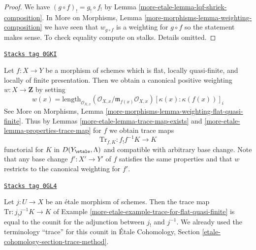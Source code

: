 \begin{proof}
We have $(g \circ f)_! = g_! \circ f_!$ by
Lemma \ref{more-etale-lemma-lqf-shriek-composition}.
In More on Morphisms, Lemma \ref{more-morphisms-lemma-weighting-composition}
we have seen that $w_{g \circ f}$ is a weighting for $g \circ f$
so the statement makes sense. To check equality compute on stalks.
Details omitted.
\end{proof}

\begin{example}

\label{more-etale-example-trace-for-flat-quasi-finite}
\href{https://stacks.math.columbia.edu/tag/0GKI}{\texttt{Stacks tag 0GKI}}

Let $f : X \to Y$ be a morphism of schemes which is flat,
locally quasi-finite, and locally of finite presentation.
Then we obtain a canonical positive weighting $w : X \to \mathbf{Z}$
by setting
$$
w(x) = \text{length}_{\mathcal{O}_{X, x}}
(\mathcal{O}_{X, x}/\mathfrak m_{f(x)} \mathcal{O}_{X, x})
[\kappa(x) : \kappa(f(x))]_i
$$
See More on Morphisms, Lemma
\ref{more-morphisms-lemma-weighting-flat-quasi-finite}.
Thus by Lemmas \ref{more-etale-lemma-trace-map-exists} and
\ref{more-etale-lemma-properties-trace-map} for $f$ we obtain trace maps
$$
\text{Tr}_{f, K} : f_!f^{-1}K \longrightarrow K
$$
functorial for $K$ in $D(Y_\etale, \Lambda)$ and compatible
with arbitrary base change. Note that any base change
$f' : X' \to Y'$ of $f$ satisfies the same properties and that $w$
restricts to the canonical weighting for $f'$.
\end{example}

\begin{remark}
\label{more-etale-remark-trace-etale-counit}
\href{https://stacks.math.columbia.edu/tag/0GL4}{\texttt{Stacks tag 0GL4}}

Let $j : U \to X$ be an \'etale morphism of schemes. Then the trace
map $\text{Tr} : j_!j^{-1}K \to K$ of
Example \ref{more-etale-example-trace-for-flat-quasi-finite} is equal to the
counit for the adjunction between $j_!$ and $j^{-1}$.
We already used the terminology ``trace'' for this counit in
\'Etale Cohomology, Section \ref{etale-cohomology-section-trace-method}.
\end{remark}

